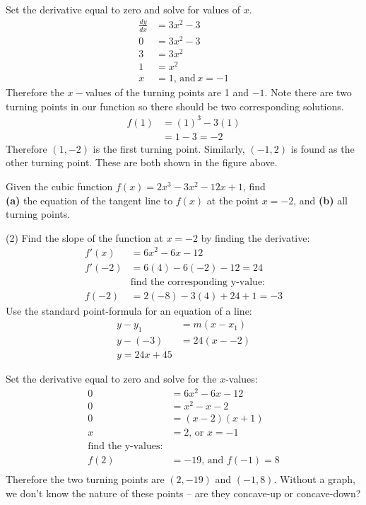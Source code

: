 \begin{multicols}{2}
\solution Set the derivative equal to zero and solve for values of $x$.
\begin{align*}
\frac{dy}{dx}&=3x^2-3\\
0&=3x^2-3\\
3&=3x^2\\
1&=x^2\\
x&=1, \,\mathrm{ and }\, x=-1
\end{align*}
Therefore the $x-$values of the turning points are 1 and $-1$. Note there are two turning points in our function so there should be two corresponding solutions.\\
\begin{align*}
f(1)&=(1)^3-3(1)\\
&=1-3=-2
\end{align*}
Therefore $(1,-2)$ is the first turning point. Similarly, $(-1,2)$ is found as the other turning point. These are both shown in the figure above.\end{multicols}

\examq Given the cubic function $\displaystyle f(x)=2x^3-3x^2-12x+1$, find\\ \textbf{(a)} the equation of the tangent line to $f(x)$ at the point $x=-2$, and \textbf{(b)} all turning points.\medskip\\
\solution
\begin{tasks}(2)
\task Find the slope of the function at $x=-2$ by finding the derivative:
\begin{align*}
f'(x)&=6x^2-6x-12\\
f'(-2)&=6(4)-6(-2)-12=24\\
&\text{find the corresponding y-value:}\\
f(-2)&=2(-8)-3(4)+24+1=-3\end{align*}
Use the standard point-formula for an equation of a line:
\begin{align*}
y-y_1&=m(x-x_1)\\
y-(-3)&=24(x--2)\\
y=24x+45\end{align*}


\task Set the derivative equal to zero and solve for the $x$-values:
\begin{align*}
0&=6x^2-6x-12\\
0&=x^2-x-2\\
0&=(x-2)(x+1)\\
x&=2\text{, or }x=-1\\
\text{find the y-values:}&\\
f(2)&=-19\text{, and }f(-1)=8\\
\end{align*}
Therefore the two turning points are $(2,-19)$ and $(-1,8)$. Without a graph, we don't know the nature of these points -- are they concave-up or concave-down?
\end{tasks}

